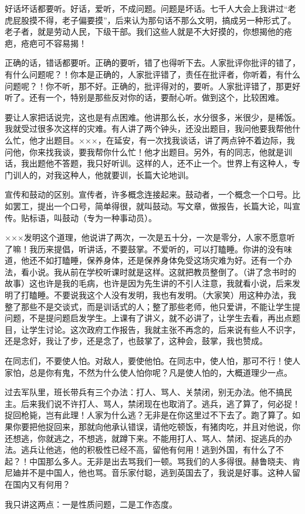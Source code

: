 好话坏话都要听。好话，爱听，不成问题。问题是坏话。七千人大会上我讲过“老虎屁股摸不得，老子偏要摸”，后来认为那句话不那么文明，搞成另一种形式了。老子者，就是劳动人民，下级干部。我们这些人就是不大好摸的，你想揭他的疮疤，疮疤可不容易揭！

正确的话，错话都要听。正确的要听，错了也得听下去。人家批评你批评的错了，有什么问题呢？！你本是正确的，人家批评错了，责任在批评者，你听着，有什么问题呢？！你不听，那不好。正确的，批评得对的，要听。人家批评错了，那更好听了。还有一个，特别是那些反对你的话，要耐心听。做到这个，比较困难。

要让人家把话说完，这也是有点困难。他讲那么长，水分很多，米很少，是稀饭。我就受过很多次这样的灾难。有人讲了两个钟头，还没出题目，我问他要我帮他什么忙，他才出题目。×××，在延安，有一次找我谈话，讲了两点钟不着边际，我问他，你来找我谈，要我帮你什么忙！他才出题目。另外，有的同志，他就是训话，我出题他不答题，我只好听训。这样的人，还不止一个。世界上有这种人，专门训人的，对我这种人，他就要训，长篇大论地训。

宣传和鼓动的区别。宣传者，许多概念连接起来。鼓动者，一个概念一个口号。比如罢工，提出一个口号，简单得很，就叫鼓动。写文章，做报告，长篇大论，叫宣传。贴标语，叫鼓动（专为一种事动员）。

×××发明这个道理，他说讲了两次，一次是五十分，一次是零分，人家不愿意听了嘛！我历来提倡，听讲话，不要鼓掌。不爱听的，可以打瞌睡。你讲的没有味道，他还不如打瞌睡，保养身体，还是保养身体免受这场灾难为好。还有一个办法，看小说。我从前在学校听课时就是这样。这就把教员整倒了。（讲了念书时的故事）这也许是我的毛病，也许是因为先生讲的不引人注意，我就看小说，后来发明了打瞌睡。不要说我这个人没有发明，我也有发明。（大家笑）用这种办法，我整了那些不是交谈式，而是训话式的人；整了那些老师，他只爱讲，不能让学生提问题，不是提问题启发学生。上课有了讲义，就不必讲了，让学生去看，再出点题目，让学生讨论。这次政府工作报告，我就主张不再念的，后来说有些人不识字，还是念好，我让了步，还是念了，也鼓掌了，这种会，鼓掌，我也赞成。

在同志们，不要使人怕。对敌人，要使他怕。在同志中，使人怕，那可不行！使人家怕，总是你有鬼，不然为什么使人怕你呢？凡是使人怕的，大概道理少一点。

过去军队里，班长带兵有三个办法：打人、骂人、关禁闭，别无办法。他不搞民主。后来我们说不许打人、骂人，禁闭现在也取消了。逃兵，逃了算了，何必捉！捉回枪毙，岂有此理！人家为什么逃？无非是在你这里过不下去了。跑了算了。如果你要把他捉回来，那就向他承认错误，请他吃顿饭，有猪肉吃，并且对他说，你还想逃，你就逃之，不想逃，就蹲下来。不能用打人、骂人、禁闭、捉逃兵的办法。逃兵让他逃，他的积极性已经不高，留他有何用！逃到外国，有什么了不起？！中国那么多人。无非是出去骂我们一顿。骂我们的人多得很。赫鲁晓夫、肯尼廸并不是中国人，他也骂。音乐家付聪，逃到英国去了，我说是好事。这种人留在国内又有何用？

我只讲这两点：一是性质问题，二是工作态度。
